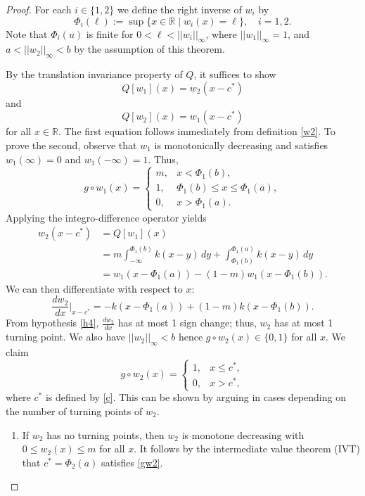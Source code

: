 \documentclass[11pt]{article}
\theoremstyle{definition}
\numberwithin{equation}{section}
\numberwithin{thm}{section}
\renewcommand{\a}{a}
\renewcommand{\b}{b}
\newcommand{\m}{m}
\newcommand{\mtwo}{1}
\begin{document}
\begin{proof}
For each $i \in \{1,2\}$ we define the right inverse of $w_i$ by
\begin{equation}
\Phi_i(\ell) := \sup \{ x \in \mathbb R \mid w_i(x) = \ell \}, \quad i=1,2.
\end{equation}
Note that $\Phi_i(u)$ is finite for $0<\ell<||w_i||_\infty$, where $||w_1||_\infty=1$, and $\a<||w_2||_\infty<\b$ by the assumption of this theorem.

By the translation invariance property of $Q$, it suffices to show
\begin{equation} \label{qw1}
Q[w_1](x) = w_2(x-c^*)
\end{equation}
and
\begin{equation} \label{qw2}
Q[w_2](x) = w_1(x-c^*)
\end{equation}
for all $x \in \mathbb R$. The first equation follows immediately from definition \eqref{w2}. To prove the second, observe that $w_1$ is monotonically decreasing and satisfies $w_1(\infty)=0$ and $w_1(-\infty)=1$. Thus,
$$
g\circ w_1(x) = \begin{cases}
\m, & x < \Phi_1(\b), \\
1, & \Phi_1(\b) \leq x \leq \Phi_1(\a), \\
0, & x > \Phi_1(\a).
\end{cases}
$$
Applying the integro-difference operator yields
$$ \begin{aligned}
w_2(x-c^*) &= Q[w_1](x) \\
&= \m \int_{-\infty}^{\Phi_1(\b)} k(x-y) \, dy + \int_{\Phi_1(\b)}^{\Phi_1(\a)} k(x-y) \, dy \\
&= w_1(x-\Phi_1(\a)) - (1-\m) w_1(x-\Phi_1(\b)).
\end{aligned}$$
We can then differentiate with respect to $x$:
$$
\frac{dw_2}{dx} \Big| _{x-c^*}= - k(x-\Phi_1(\a)) + (\mtwo-\m) k(x-\Phi_1(\b)).
$$
From hypothesis \ref{h4}, $\frac{dw_2}{dx}$ has at most 1 sign change; thus, $w_2$ has at most 1 turning point. We also have $|| w_2 || _\infty <  \b$ hence $g\circ w_2(x) \in \{0, 1 \}$ for all $x$. We claim
\begin{equation} \label{gw2}
g\circ w_2(x) = \begin{cases}
1, & x \leq c^*, \\
0, & x > c^*,
\end{cases}
\end{equation}
where $c^*$ is defined by \eqref{c}. This can be shown by arguing in cases depending on the number of turning points of $w_2$.
\begin{enumerate}[{Case} 1.]
\item If $w_2$ has no turning points, then $w_2$ is monotone decreasing with $0 \leq w_2(x) \leq \m$ for all $x$. It follows by the intermediate value theorem (IVT) that $c^* = \Phi_2(\a)$ satisfies \eqref{gw2}. 


\end{enumerate}
\end{proof}
\end{document}
